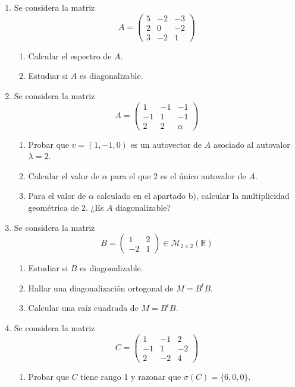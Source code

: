 \documentclass[12pt,letterpaper]{article}
\begin{document}
\begin{enumerate}
  \item Se considera la matriz
  $$
  A=\begin{pmatrix}
    5 & -2 & -3\\
    2 & 0 & -2\\
    3 & -2 & 1
  \end{pmatrix}
  $$
  \begin{enumerate}
    \item Calcular el espectro de $A$.
    \item Estudiar si $A$ es diagonalizable.
  \end{enumerate}
  \item Se considera la matriz
  $$
  A=\begin{pmatrix}
    1 & -1 & -1\\
    -1 & 1 & -1\\
    2 & 2 & \alpha
  \end{pmatrix}
  $$
  \begin{enumerate}
    \item Probar que $v = (1,-1, 0)$ es un autovector de $A$ asociado al autovalor $\lambda = 2$.
    \item Calcular el valor de $\alpha$ para el que 2 es el único autovalor de $A$.
    \item Para el valor de $\alpha$ calculado en el apartado b), calcular la multiplicidad geométrica de 2. ¿Es $A$ diagonalizable?
  \end{enumerate}
  \item Se considera la matriz
  $$
  B=\begin{pmatrix}
  1 & 2\\
  -2 & 1
  \end{pmatrix} \in \mathcal{M}_{2\times2}(\mathbb{R}) 
  $$
  \begin{enumerate}
    \item Estudiar si $B$ es diagonalizable.
    \item Hallar una diagonalización ortogonal de $M = B^tB$.
    \item Calcular una raíz cuadrada de $M = B^tB$.
  \end{enumerate}
  \item Se considera la matriz
  $$
  C=\begin{pmatrix}
  1 & -1 & 2\\
  -1 & 1 & -2\\
  2 & -2 & 4
  \end{pmatrix}
  $$
  \begin{enumerate}
    \item Probar que $C$ tiene rango 1 y razonar que $\sigma(C) = \{6, 0, 0\}$.

\end{enumerate}
\end{enumerate}
\end{document}
